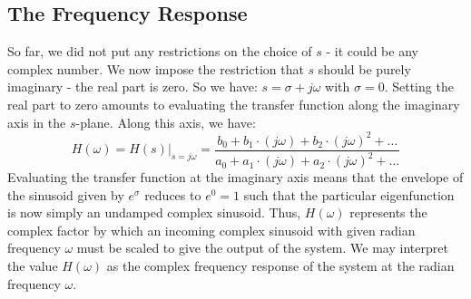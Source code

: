 \subsection{The Frequency Response} 
So far, we did not put any restrictions on the choice of $s$ - it could be any complex number. We now impose the restriction that $s$ should be purely imaginary - the real part is zero. So we have: $s = \sigma + j \omega$ with $\sigma = 0$. Setting the real part to zero amounts to evaluating the transfer function along the imaginary axis in the $s$-plane. Along this axis, we have:
\begin{equation}
 H(\omega) = H(s) |_{s=j \omega} = \frac{b_0 + b_1 \cdot (j \omega) + b_2 \cdot (j \omega)^2 + \ldots}
                                        {a_0 + a_1 \cdot (j \omega) + a_2 \cdot (j \omega)^2 + \ldots}
\end{equation} 
Evaluating the transfer function at the imaginary axis means that the envelope of the sinusoid given by $e^\sigma$ reduces to $e^0=1$ such that the particular eigenfunction is now simply an undamped complex sinusoid. Thus, $H(\omega)$ represents the complex factor by which an incoming complex sinusoid with given radian frequency $\omega$ must be scaled to give the output of the system. We may interpret the value $H(\omega)$ as the complex frequency response of the system at the radian frequency $\omega$.

